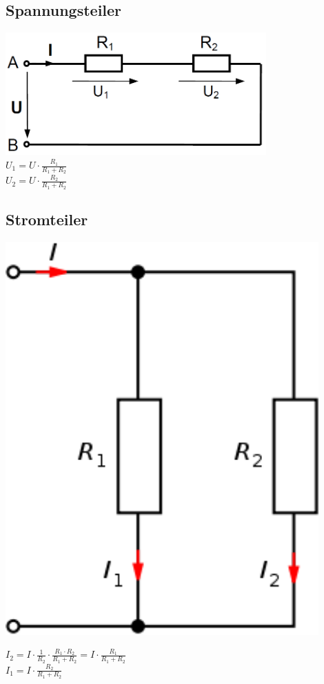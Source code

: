 \begin{minipage}{8.5cm}
\subsection{Spannungsteiler}
\includegraphics[width=0.75\textwidth]{pics/spannungsteiler}\\
$ U_1 = U \cdot \frac{R_1}{R_1 + R_2}$ \\
$ U_2 = U \cdot \frac{R_2}{R_1 + R_2}$ \\
\end{minipage}
\begin{minipage}{3cm}
\subsection{Stromteiler}
\includegraphics[width=0.9\textwidth]{pics/stromteiler2}\\
\end{minipage}
\begin{minipage}{5cm}
$I_{2} = I \cdot \frac{1}{R_{2}} \cdot \frac{R_{1} \cdot R_{2}}{R_{1} + R_{2}} = I \cdot \frac{R_{1}}{R_{1} + R_{2}} $ \\
$I_{1} = I \cdot \frac{R_{2}}{R_{1} + R_{2}} $ \\
\end{minipage}



